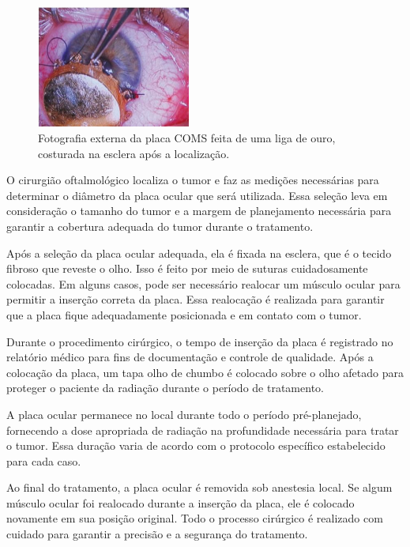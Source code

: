 \documentclass[11pt,a4paper]{article}
\begin{document}
    \begin{figure}
        \centering
        \includegraphics[width=0.45\textwidth]{Imagens/placaComsOuroMC.JPG}
        \caption{Fotografia externa da placa COMS feita de uma liga de ouro, costurada na esclera após a localização.}
    \end{figure}

    O cirurgião oftalmológico localiza o tumor e faz as medições necessárias para determinar o diâmetro da placa ocular que será utilizada. Essa seleção leva em consideração o tamanho do tumor e a margem de planejamento necessária para garantir a cobertura adequada do tumor durante o tratamento.

    Após a seleção da placa ocular adequada, ela é fixada na esclera, que é o tecido fibroso que reveste o olho. Isso é feito por meio de suturas cuidadosamente colocadas. Em alguns casos, pode ser necessário realocar um músculo ocular para permitir a inserção correta da placa. Essa realocação é realizada para garantir que a placa fique adequadamente posicionada e em contato com o tumor.

    Durante o procedimento cirúrgico, o tempo de inserção da placa é registrado no relatório médico para fins de documentação e controle de qualidade. Após a colocação da placa, um tapa olho de chumbo é colocado sobre o olho afetado para proteger o paciente da radiação durante o período de tratamento.

    A placa ocular permanece no local durante todo o período pré-planejado, fornecendo a dose apropriada de radiação na profundidade necessária para tratar o tumor. Essa duração varia de acordo com o protocolo específico estabelecido para cada caso.

    Ao final do tratamento, a placa ocular é removida sob anestesia local. Se algum músculo ocular foi realocado durante a inserção da placa, ele é colocado novamente em sua posição original. Todo o processo cirúrgico é realizado com cuidado para garantir a precisão e a segurança do tratamento.
\end{document}
